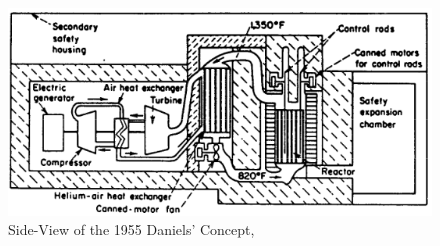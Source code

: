 \begin{figure}[h!]
\centering
\includegraphics[width=0.6\linewidth]{figures/daniels-1}
\caption{Side-View of the 1955 Daniels' Concept, \cite{simnad_early_1991}}
\label{fig:daniels-1}
\end{figure}